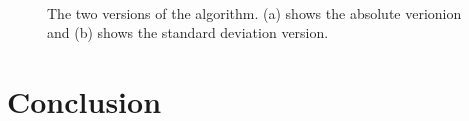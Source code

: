 \begin{figure}
	\centering     %
	\\
	\caption{The two versions of the algorithm. (a) shows the absolute verionion and (b) shows the standard deviation version.\label{fig:fullAlgorithm}}
\end{figure}

\section{Conclusion}
